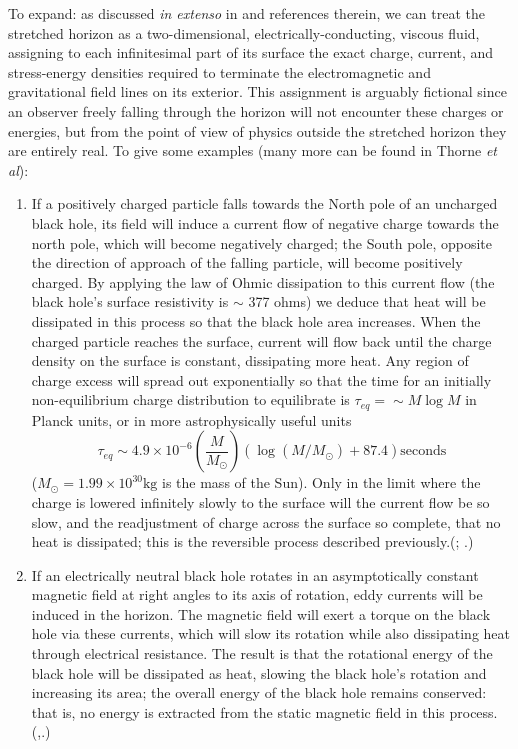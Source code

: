 \documentclass[12pt]{article}
\newcommand{\be}{\begin{equation}}
\newcommand{\ee}{\end{equation}}
\begin{document}
To expand: as discussed \emph{in extenso} in  and references therein, we can treat the stretched horizon as a two-dimensional, electrically-conducting, viscous fluid, assigning to each infinitesimal part of its surface the exact charge, current, and stress-energy densities required to terminate the electromagnetic and gravitational field lines on its exterior. This assignment is arguably fictional since an observer freely falling through the horizon will not encounter these charges or energies, but from the point of view of physics outside the stretched horizon they are entirely real. To give some examples (many more can be found in Thorne \emph{et al}):
\begin{enumerate}
\item If a positively charged particle falls towards the North pole of an uncharged black hole, its field will induce a current flow of negative charge towards the north pole, which will become negatively charged; the South pole, opposite the direction of approach of the falling particle, will become positively charged. By applying the law of Ohmic dissipation to this current flow (the black hole's surface resistivity is $\sim$ 377 ohms) we deduce that heat will be dissipated in this process so that the black hole area increases. When the charged particle reaches the surface, current will flow back until the charge density on the surface is constant, dissipating more heat. Any region of charge excess will spread out exponentially so that the time for an initially non-equilibrium charge distribution to equilibrate is $\tau_{eq}=\sim M \log M$ in Planck units, or in more astrophysically useful units
\be\label{mlogm}
\tau_{eq} \sim 4.9 \times 10^{-6} \left(\frac{M}{M_\odot}\right)\left( \log (M/M_\odot) + 87.4\right) \mbox{seconds}
\ee
($M_\odot=1.99 \times 10^{30} \mathrm{kg}$ is the mass of the Sun). Only in the limit where the charge is lowered infinitely slowly to the surface will the current flow be so slow, and the readjustment of charge across the surface so complete, that no heat is dissipated; this is the reversible process described previously.(; .)
\item If an electrically neutral black hole rotates in an asymptotically constant magnetic field at right angles to its axis of rotation, eddy currents will be induced in the horizon. The magnetic field will exert a torque on the black hole via these currents, which will slow its rotation while also dissipating heat through electrical resistance. The result is that the rotational energy of the black hole will be dissipated as heat, slowing the black hole's rotation and increasing its area; the overall energy of the black hole remains conserved: that is, no energy is extracted from the static magnetic field in this process. (,\cite[pp.102--106]{membraneparadigm}.)

\end{enumerate}
\end{document}
